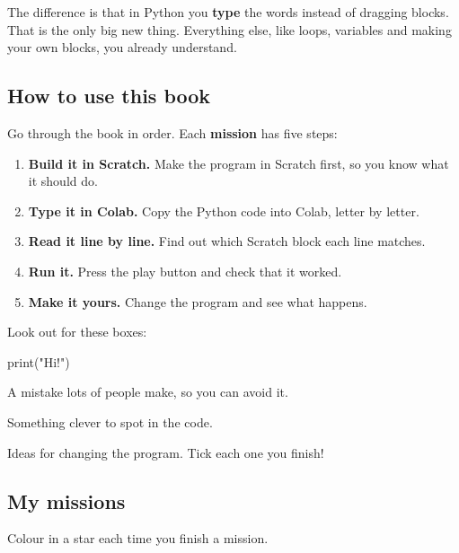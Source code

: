 \documentclass[12pt,a4paper]{article}
\begin{document}
The difference is that in Python you \textbf{type} the words instead of dragging blocks. That is the only big new thing. Everything else, like loops, variables and making your own blocks, you already understand.

\subsection*{How to use this book}

Go through the book in order. Each \textbf{mission} has five steps:

\begin{enumerate}[label=\textbf{\arabic*.}]
  \item \textbf{Build it in Scratch.} Make the program in Scratch first, so you know what it should do.
  \item \textbf{Type it in Colab.} Copy the Python code into Colab, letter by letter.
  \item \textbf{Read it line by line.} Find out which Scratch block each line matches.
  \item \textbf{Run it.} Press the play button and check that it worked.
  \item \textbf{Make it yours.} Change the program and see what happens.
\end{enumerate}

Look out for these boxes:

\begin{tcbraster}[raster columns=2, raster equal height, raster column skip=8pt]
\begin{typethis}
print("Hi!")
\end{typethis}
\begin{watchout}
A mistake lots of people make, so you can avoid it.
\end{watchout}
\begin{think}
Something clever to spot in the code.
\end{think}
\begin{challenge}
Ideas for changing the program. Tick each one you finish!
\end{challenge}
\end{tcbraster}

\subsection*{My missions}
Colour in a star each time you finish a mission.
\end{document}
